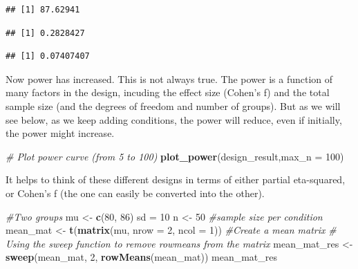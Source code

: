 \documentclass[]{book}
\newenvironment{Shaded}{\begin{snugshade}}{\end{snugshade}}
\newcommand{\CommentTok}[1]{\textcolor[rgb]{0.56,0.35,0.01}{\textit{#1}}}
\newcommand{\DataTypeTok}[1]{\textcolor[rgb]{0.13,0.29,0.53}{#1}}
\newcommand{\DecValTok}[1]{\textcolor[rgb]{0.00,0.00,0.81}{#1}}
\newcommand{\KeywordTok}[1]{\textcolor[rgb]{0.13,0.29,0.53}{\textbf{#1}}}
\newcommand{\NormalTok}[1]{#1}
\newcommand{\OperatorTok}[1]{\textcolor[rgb]{0.81,0.36,0.00}{\textbf{#1}}}
\newcommand{\StringTok}[1]{\textcolor[rgb]{0.31,0.60,0.02}{#1}}
\begin{document}
\begin{verbatim}
## [1] 87.62941
\end{verbatim}

\begin{Shaded}
\end{Shaded}

\begin{verbatim}
## [1] 0.2828427
\end{verbatim}

\begin{Shaded}
\end{Shaded}

\begin{verbatim}
## [1] 0.07407407
\end{verbatim}

Now power has increased. This is not always true. The power is a function of many factors in the design, incuding the effect size (Cohen's f) and the total sample size (and the degrees of freedom and number of groups). But as we will see below, as we keep adding conditions, the power will reduce, even if initially, the power might increase.

\begin{Shaded}
\begin{Highlighting}[]
\CommentTok{# Plot power curve (from 5 to 100)}
\KeywordTok{plot_power}\NormalTok{(design_result,}\DataTypeTok{max_n =} \DecValTok{100}\NormalTok{)}
\end{Highlighting}
\end{Shaded}

It helps to think of these different designs in terms of either partial eta-squared, or Cohen's f (the one can easily be converted into the other).

\begin{Shaded}
\begin{Highlighting}[]
\CommentTok{#Two groups}
\NormalTok{mu <-}\StringTok{ }\KeywordTok{c}\NormalTok{(}\DecValTok{80}\NormalTok{, }\DecValTok{86}\NormalTok{)}
\NormalTok{sd =}\StringTok{ }\DecValTok{10}
\NormalTok{n <-}\StringTok{ }\DecValTok{50} \CommentTok{#sample size per condition}
\NormalTok{mean_mat <-}\StringTok{ }\KeywordTok{t}\NormalTok{(}\KeywordTok{matrix}\NormalTok{(mu,}
\DataTypeTok{nrow =} \DecValTok{2}\NormalTok{,}
\DataTypeTok{ncol =} \DecValTok{1}\NormalTok{)) }\CommentTok{#Create a mean matrix}
\CommentTok{# Using the sweep function to remove rowmeans from the matrix}
\NormalTok{mean_mat_res <-}\StringTok{ }\KeywordTok{sweep}\NormalTok{(mean_mat, }\DecValTok{2}\NormalTok{, }\KeywordTok{rowMeans}\NormalTok{(mean_mat))}
\NormalTok{mean_mat_res}
\end{Highlighting}
\end{Shaded}
\end{document}
